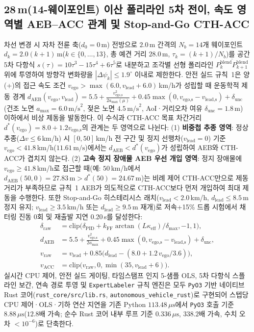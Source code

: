 \documentclass[10pt,twocolumn,a4paper]{article}
\begin{document}
\subsection{28\,m(14-웨이포인트) 이산 폴리라인 5차 전이, 속도 영역별 AEB--ACC 관계 및 Stop-and-Go CTH-ACC}
차선 변경 시 자차 전륜 축($d_0=0$\,m) 전방으로 $2.0$\,m 간격의 $N_b = 14$개 웨이포인트 $d_k = 2.0(k+1)$\,m($k\in\{0,\dots,13\}$, 총 예견 거리 $28.0$\,m, $\tau_k = (k+1)/N_b$)를 공간 5차 다항식 $s(\tau) = 10\tau^3 - 15\tau^4 + 6\tau^5$로 내분하고 조각별 선형 폴리라인 $\overline{P^{\text{blend}}_k P^{\text{blend}}_{k+1}}$ 위에 투영하여 방향각 변화량을 $|\Delta\psi_k|\le 1.9^\circ$ 이내로 제한한다. 안전 실드 규칙~1은 양(+)의 접근 속도 조건 $v_{\text{ego}} > \max(6.0, v_{\text{lead}} + 6.0)$\,km/h가 성립할 때 운동학적 제동 경계 $d_{\text{AEB}}(v_{\text{ego}}, v_{\text{lead}}) = 5.5 + \frac{v_{\text{ego,s}}^2}{2a_{\max}(\mu)} + 0.45\max(0, v_{\text{ego,s}}-v_{\text{lead,s}}) + \delta_{\text{unc}}$ (건조 노면 $a_{\max}=6.0\,\text{m/s}^2$, 젖은 노면 $4.5\,\text{m/s}^2$, AoI·거리오차 여유 $\delta_{\text{unc}}=1.8$\,m) 이하에서 비상 제동을 발동한다. 이 수식과 CTH-ACC 목표 차간거리 $d^*(v_{\text{ego}}) = 8.0 + 1.2v_{\text{ego,s}}$의 관계는 두 영역으로 나뉜다: (1) \textbf{비중첩 추종 영역}: 정상 추종($\Delta v \le 6$\,km/h) 시 $[0, 50]$\,km/h 전 구간 및 정지 선행차($v_{\text{lead}}=0$) 기준 $v_{\text{ego}} < 41.8$\,km/h($11.61\,\text{m/s}$)에서는 $d_{\text{AEB}} < d^*(v_{\text{ego}})$가 성립하여 AEB와 CTH-ACC가 겹치지 않는다. (2) \textbf{고속 정지 장애물 AEB 우선 개입 영역}: 정지 장애물에 $v_{\text{ego}} \ge 41.8$\,km/h로 접근할 때(예: $50$\,km/h에서 $d_{\text{AEB}}(50,0)=27.83\,\text{m} > d^*(50)=24.67\,\text{m}$)는 비례 제어 CTH-ACC만으로 제동 거리가 부족하므로 규칙~1 AEB가 의도적으로 CTH-ACC보다 먼저 개입하여 최대 제동을 수행한다. 또한 Stop-and-Go 히스테리시스 래치($v_{\text{lead}} < 2.0$\,km/h, $d_{\text{lead}}\le 8.5$\,m 정지 유지; $v_{\text{lead}}\ge 3.5$\,km/h 또는 $d_{\text{lead}}\ge 9.5$\,m 재개)로 저속+15\% 드롭 시험에서 채터링 진동 0회 및 재출발 지연 0.20\,s를 달성한다:
\begin{align}
    \delta_{\text{raw}} &= \text{clip}\big(\delta_{\text{PID}} + k_{\text{FF}}\arctan(L\kappa_{\text{eff}})/\delta_{\max}, -1, 1\big), \\
    d_{\text{AEB}} &= 5.5 + \frac{v_{\text{ego,s}}^2}{2a_{\max}} + 0.45\max(0, v_{\text{ego,s}} - v_{\text{lead,s}}) + \delta_{\text{unc}}, \\
    v_{\text{raw}} &= v_{\text{lead}} + 0.85\big(d_{\text{lead}} - (8.0 + 1.2\,v_{\text{ego}}/3.6)\big), \\
    v_{\text{ACC}} &= \text{clip}\big(v_{\text{raw}}, 0, \min(35, v_{\text{lead}} + 6)\big).
\end{align}
실시간 CPU 제어, 안전 실드 게이팅, 타임스탬프 인지 5-샘플 OLS, 5차 다항식 스플라인 보간, 연속 경로 투영 및 \texttt{ExpertLabeler} 규칙 엔진은 모두 \texttt{PyO3} 기반 네이티브 Rust 코어(\texttt{rust\_core/src/lib.rs}, \texttt{autonomous\_vehicle\_rust})로 구현되어 스텝당 CPU 제어·OLS·기하 연산 지연을 기존 Python $113.48\,\mu\text{s}$에서 \texttt{PyO3} 호출 기준 $8.88\,\mu\text{s}$($12.8$배 가속; 순수 Rust 코어 내부 루프 기준 $0.336\,\mu\text{s}$, $338.2$배 가속, 수치 오차 $<10^{-6}$)로 단축한다.
\end{document}
